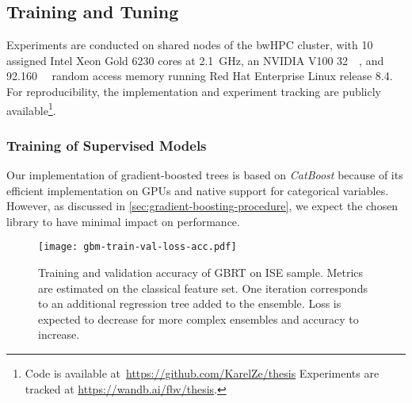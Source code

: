 \subsection{Training and Tuning}\label{sec:training-and-tuning}

Experiments are conducted on shared nodes of the bwHPC cluster, with 10 assigned Intel Xeon Gold 6230 cores at \SI{2.1}{\GHz}, an NVIDIA V100 \SI{32}{\giga\byte}, and \SI{92.160}{\giga\byte} random access memory running Red Hat Enterprise Linux release 8.4. For reproducibility, the implementation and experiment tracking are publicly available\footnote{Code is available at~\url{https://github.com/KarelZe/thesis} Experiments are tracked at \url{https://wandb.ai/fbv/thesis}.}.

\subsubsection{Training of Supervised
    Models}\label{sec:training-of-supervised-models}

Our implementation of gradient-boosted trees is based on \emph{CatBoost} \autocite[][5--6]{prokhorenkovaCatBoostUnbiasedBoosting2018} because of its efficient implementation on \glspl{GPU} and native support for categorical variables. However, as discussed in \cref{sec:gradient-boosting-procedure}, we expect the chosen library to have minimal impact on performance.

\begin{figure}[ht]
    \centering
    \texttt{[image: gbm-train-val-loss-acc.pdf]}
    \caption[Training and Validation Accuracy of  on  Sample]{Training and validation accuracy of \gls{GBRT} on \gls{ISE} sample. Metrics are estimated on the classical feature set. One iteration corresponds to an additional regression tree added to the ensemble. Loss is expected to decrease for more complex ensembles and accuracy to increase.}
    \label{fig:gbm-train-val-loss-acc}
\end{figure}

